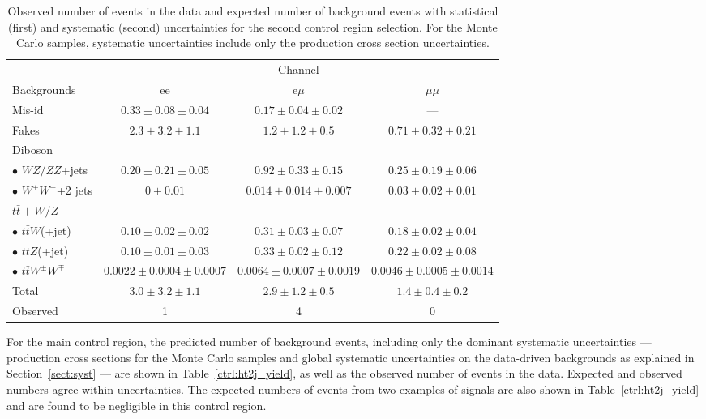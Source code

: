 \begin{table}[p]
\begin{center}
    \vspace{1cm}

    \caption{Observed number of events in the data and expected number of background events with 
        statistical (first) and systematic (second) uncertainties for the second control region
        selection. For the Monte Carlo samples, systematic uncertainties include only the production 
        cross section uncertainties.}\label{ctrl:met_yield}
    \begin{tabular}{l|c|c|c}
      \hline\hline
       & \multicolumn{3}{c}{Channel} \\
      \cline{2-4}
      Backgrounds & ee & e$\mu$ & $\mu\mu$ \\
      \hline
      Mis-id & $0.33\pm 0.08 \pm 0.04$ & $0.17\pm 0.04 \pm 0.02$ & --- \\
      Fakes & $2.3\pm 3.2 \pm 1.1$ & $1.2\pm 1.2 \pm 0.5$ & $0.71\pm 0.32\pm 0.21$ \\
      \hline
      Diboson & & & \\
      $\bullet$ $WZ/ZZ$+jets & $0.20\pm 0.21 \pm 0.05$ & $0.92\pm 0.33\pm 0.15$ & $0.25\pm 0.19\pm 0.06$ \\
      $\bullet$ $W^{\pm}W^\pm$+2 jets & $0\pm 0.01$ & $0.014\pm 0.014\pm 0.007$ & $0.03\pm 0.02\pm 0.01$ \\
      \hline
      $t\bar{t}+W/Z$ & & & \\
      $\bullet$ $t\bar{t}W$(+jet) & $0.10\pm 0.02\pm 0.02$ & $0.31\pm 0.03\pm 0.07$ & $0.18\pm 0.02\pm 0.04$ \\
      $\bullet$ $t\bar{t}Z$(+jet) & $0.10\pm 0.01\pm 0.03$ & $0.33\pm 0.02\pm 0.12$ & $0.22\pm 0.02\pm 0.08$ \\
      $\bullet$ $t\bar{t}W^{\pm}W^\mp$ & $0.0022\pm 0.0004\pm 0.0007$ & $0.0064\pm 0.0007\pm 0.0019$ & $0.0046\pm 0.0005\pm 0.0014$ \\
      \hline
      Total & $3.0 \pm 3.2 \pm 1.1$ & $2.9 \pm 1.2 \pm 0.5$ & $1.4 \pm 0.4 \pm 0.2$ \\
      \hline
      Observed & 1 & 4 & 0 \\
      \hline
    \end{tabular}
  \end{center}
\end{table}

For the main control region, 
the predicted number of background events, including only the dominant systematic
uncertainties --- production cross sections for the Monte Carlo samples and global systematic
uncertainties on the data-driven backgrounds as explained in Section~\ref{sect:syst} --- are
shown in Table~\ref{ctrl:ht2j_yield}, as well as the observed number of events in the data.
Expected and observed numbers agree within uncertainties. The expected numbers of events from
two examples of signals are also shown in Table~\ref{ctrl:ht2j_yield} and are found to be
negligible in this control region.


